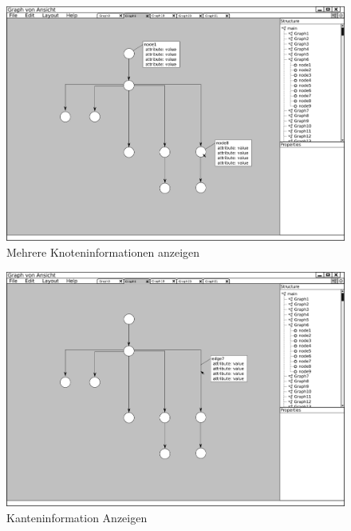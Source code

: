 \begin{figure}[ht]
  \centering
  \includegraphics[width=380pt]{resourcen/gui_view_showInfoInView_node_multi.png}
  \caption{Mehrere Knoteninformationen anzeigen}
  \label{fig:gui_view_showInfoInView_node_multi}
\end{figure}

\begin{figure}[ht]
  \centering
  \includegraphics[width=380pt]{resourcen/gui_view_showInfoInView_edge.png}
  \caption{Kanteninformation Anzeigen}
  \label{fig:gui_view_showInfoInView_edge}
\end{figure}

